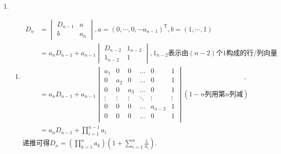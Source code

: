 \begin{enumerate}
    \item \begin{enumerate}
        \item \[\begin{aligned}
        D_n&=\begin{vmatrix}
        D_{n-1}&a\\
        b&a_n
        \end{vmatrix},a=(0, \cdots, 0, -a_{n-1})^\mathrm{T}, b=(1, \cdots, 1)\\
        &=a_nD_{n-1}+a_{n-1}\begin{vmatrix}
        D_{n-2}&1_{n-2}\\
        1_{n-2}&1
        \end{vmatrix}, 1_{n-2}\text{表示由}(n-2)\text{个1构成的行/列向量}\\
        &=a_nD_{n-1}+a_{n-1}\begin{vmatrix}
        a_1&0&0&\ldots&0&1\\
        0&a_2&0&\ldots&0&1\\
        0&0&a_3&\ldots&0&1\\
        \vdots&\vdots&\vdots&\ddots&\vdots&\vdots\\
        0&0&0&\ldots&a_{n-2}&1\\
        0&0&0&\ldots&0&1\\
        \end{vmatrix}(1-n\text{列用第}n\text{列减})\\
        &=a_nD_{n-1}+\prod_{i=1}^{n-1}a_i
        \end{aligned},\]
        递推可得$\displaystyle D_n=\left(\prod_{k=1}^na_k\right)
        \left(1+\sum_{i=1}^n\frac{1}{a_i}\right)$.


\end{enumerate}
\end{enumerate}
